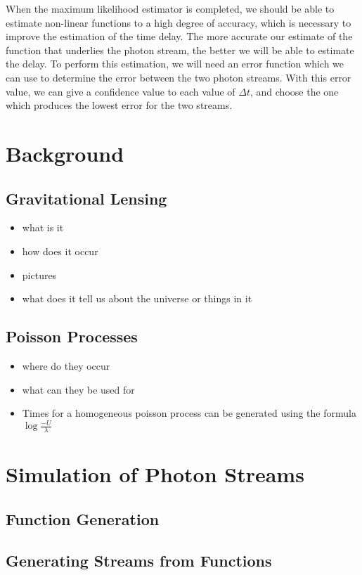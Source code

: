 \documentclass[a4paper,11pt]{article}
\begin{document}
    When the maximum likelihood estimator is completed, we should be
    able to estimate non-linear functions to a high degree of
    accuracy, which is necessary to improve the estimation of the time
    delay. The more accurate our estimate of the function that
    underlies the photon stream, the better we will be able to
    estimate the delay. To perform this estimation, we will need an
    error function which we can use to determine the error between the
    two photon streams. With this error value, we can give a
    confidence value to each value of $\Delta t$, and choose the one
    which produces the lowest error for the two streams.
\section{Background}
\label{sec-2}
\subsection{Gravitational Lensing}
\label{sec-2-1}

\begin{itemize}
\item what is it
\item how does it occur
\item pictures
\item what does it tell us about the universe or things in it
\end{itemize}
\subsection{Poisson Processes}
\label{sec-2-2}

\begin{itemize}
\item where do they occur
\item what can they be used for
\item Times for a homogeneous poisson process can be generated using
     the formula $\log\frac{-U}{\lambda}$
\end{itemize}
\section{Simulation of Photon Streams}
\label{sec-3}
\subsection{Function Generation}
\label{sec-3-1}
\subsection{Generating Streams from Functions}
\label{sec-3-2}
\end{document}
